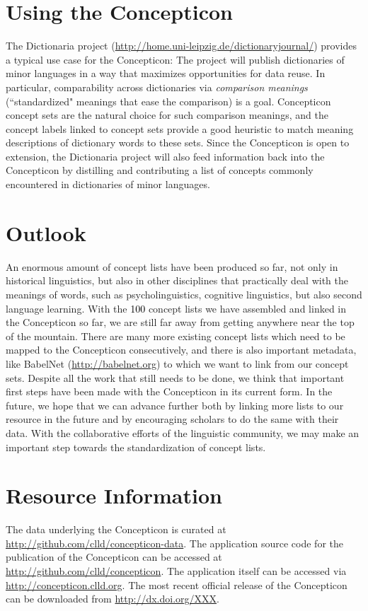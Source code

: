 \documentclass[10pt, a4paper]{article}
\newcommand{\listnumber}{\textcolor{black}{100} }
\begin{document}
\section{Using the Concepticon}
\noindent The Dictionaria project (\url{http://home.uni-leipzig.de/dictionaryjournal/}) provides a
typical use case for the Concepticon: The project will publish dictionaries of minor languages in a
way that maximizes opportunities for data reuse. In particular, comparability across dictionaries
via \emph{comparison meanings} (``standardized" meanings that ease the comparison) is a goal.
Concepticon concept sets are the natural choice for such comparison meanings, and the concept labels
linked to concept sets provide a good heuristic to match meaning descriptions of dictionary words to
these sets. Since the Concepticon is open to extension, the Dictionaria project will also feed
information back into the Concepticon by distilling and contributing a list of concepts commonly
encountered in dictionaries of minor languages.

\section{Outlook}
\noindent An enormous amount of concept lists have been produced so far, not only in historical
linguistics, but also in other disciplines that practically deal with the meanings of words, such as
psycholinguistics, cognitive linguistics, but also second language learning.  With the \listnumber
concept lists we have assembled and linked in the Concepticon so far, we are still far away from
getting anywhere near the top of the mountain. There are many more existing concept lists which need
to be mapped to the Concepticon consecutively, and there is also important metadata, like BabelNet
(\url{http://babelnet.org}) to which we want to link from our concept sets.
Despite all the work that still needs to be done, we think that important first steps
have been made with the Concepticon in its current form.
In the future, we hope that we can advance further both by
linking more lists to our resource in the future and by encouraging scholars to do the same with
their data. With the collaborative efforts of the linguistic community, we may make an important
step towards the standardization of concept lists.
\section{Resource Information}
\noindent The data underlying the Concepticon is curated at \url{http://github.com/clld/concepticon-data}. The
application source code for the publication of the Concepticon can be accessed at
\url{http://github.com/clld/concepticon}. The application itself can be accessed via
\url{http://concepticon.clld.org}. The most recent official release of the Concepticon can be downloaded from \url{http://dx.doi.org/XXX}.

\free

\scriptsize

\end{document}
